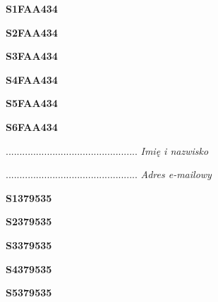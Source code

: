 \begin{turn}{90}\huge \textbf{S1FAA434}\end{turn}

\begin{turn}{90}\huge \textbf{S2FAA434}\end{turn}

\begin{turn}{90}\huge \textbf{S3FAA434}\end{turn}

\begin{turn}{90}\huge \textbf{S4FAA434}\end{turn}

\begin{turn}{90}\huge \textbf{S5FAA434}\end{turn}

\begin{turn}{90}\huge \textbf{S6FAA434}\end{turn}

\begin{turn}{90}\begin{minipage}{\linewidth} \vspace{20mm} ................................................  \textit{Imię i nazwisko}\end{minipage}\end{turn}

\begin{turn}{90}\begin{minipage}{\linewidth} \vspace{20mm} ................................................  \textit{Adres e-mailowy}\end{minipage}\end{turn}

\begin{turn}{90}\huge \textbf{S1379535}\end{turn}

\begin{turn}{90}\huge \textbf{S2379535}\end{turn}

\begin{turn}{90}\huge \textbf{S3379535}\end{turn}

\begin{turn}{90}\huge \textbf{S4379535}\end{turn}

\begin{turn}{90}\huge \textbf{S5379535}\end{turn}

